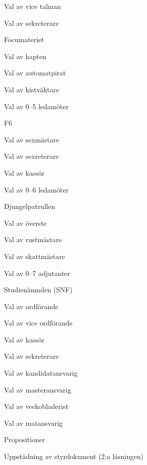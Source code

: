 \documentclass[slutlig]{sektionsmote}
\begin{document}
\begin{ootd}
\begin{ootd}
\begin{ootd}
        \item Val av vice talman
        \item Val av sekreterare
    \end{ootd}
    \item Focumateriet
    \begin{ootd}
        \item Val av kapten
        \item Val av automatpirat
        \item Val av kistväktare
        \item Val av 0--5 ledamöter
    \end{ootd}
    \item F6
    \begin{ootd}
        \item Val av sexmästare
        \item Val av sexreterare
        \item Val av kassör
        \item Val av 0--6 ledamöter
    \end{ootd}
    \item Djungelpatrullen
    \begin{ootd}
        \item Val av överste
        \item Val av rustmästare
        \item Val av skattmästare
        \item Val av 0--7 adjutanter
    \end{ootd}
    \item Studienämnden (SNF)
    \begin{ootd}
        \item Val av ordförande
        \item Val av vice ordförande
        \item Val av kassör
        \item Val av sekreterare
        \item Val av kandidatansvarig
        \item Val av masteransvarig
        \item Val av veckobladerist
        \item Val av matansvarig
    \end{ootd}
\end{ootd}

\item{Propositioner}
\begin{ootd}
    \item Uppstädning av styrdokument (2:a läsningen)
\end{ootd}


\end{ootd}
\end{document}
